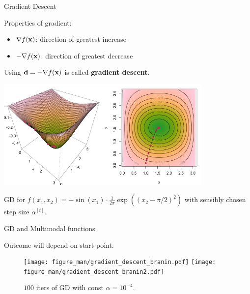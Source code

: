 \documentclass[11pt,compress,t,notes=noshow, xcolor=table]{beamer}
\begin{document}

\begin{vbframe}{Gradient Descent}

	Properties of gradient: 

	\begin{itemize}
		\item $\nabla f(\mathbf{x})$: direction of greatest increase
		\item $- \nabla f(\mathbf{x})$: direction of greatest decrease
	\end{itemize}

	\vspace*{0.3cm}

	Using $\mathbf{d} = - \nabla f(\mathbf{x})$ is called \textbf{gradient descent}. 

	\begin{center}
		\includegraphics[width = 0.8\textwidth]{figure_man/iter-example-descent1.png} \\
		\begin{footnotesize}
			GD for $f(x_1, x_2) = - \sin(x_1) \cdot \frac{1}{2\pi} \exp\left( (x_2 - \pi / 2)^2 \right)$ with sensibly chosen step size $\alpha^{[t]}$. 
		\end{footnotesize}
	\end{center}


\end{vbframe}

\begin{vbframe}{GD and Multimodal functions}

Outcome will depend on start point.

\vspace{0.5\baselineskip}

\begin{figure}
	\texttt{[image: figure\_man/gradient\_descent\_branin.pdf]} \texttt{[image: figure\_man/gradient\_descent\_branin2.pdf]}\\
	\vspace*{-0.3cm}
	\begin{footnotesize}
		$100$ iters of GD with const $\alpha = 10^{-4}$.
	\end{footnotesize}
\end{figure}

\end{vbframe}
\end{document}
